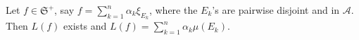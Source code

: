 Let $f \in \mathfrak{S}^+$, say $f = \sum_{k=1}^{n} \alpha_k \xi_{E_k}$, where the $E_k$'s are pairwise disjoint and in $\mathcal{A}$. Then $L(f)$ exists and $L(f) = \sum_{k=1}^{n} \alpha_k \mu(E_k)$.